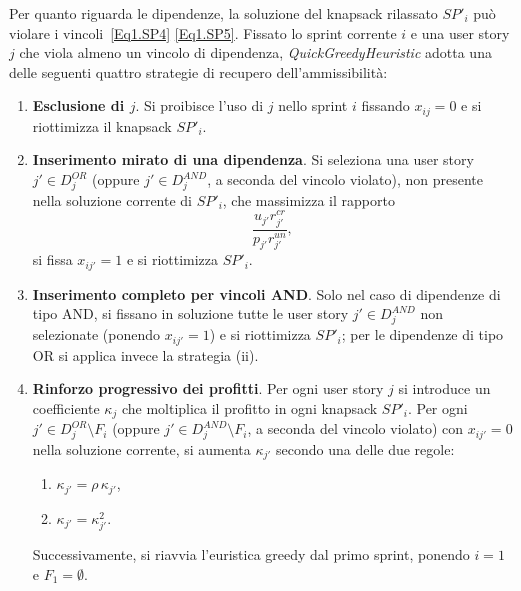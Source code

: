 \documentclass[12pt,a4paper,openright,twoside]{book}
\begin{document}
Per quanto riguarda le dipendenze, la soluzione del knapsack rilassato $SP'_i$ può violare i vincoli~\eqref{Eq1.SP4} \eqref{Eq1.SP5}. Fissato lo sprint corrente $i$ e una user story $j$ che viola almeno un vincolo di dipendenza, \textit{QuickGreedyHeuristic} adotta una delle seguenti quattro strategie di recupero dell'ammissibilità:
\begin{enumerate}[label=\roman*]
\item \textbf{Esclusione di $j$}. Si proibisce l'uso di $j$ nello sprint $i$ fissando $x_{ij}=0$ e si riottimizza il knapsack $SP'_i$.
\item \textbf{Inserimento mirato di una dipendenza}. Si seleziona una user story $j' \in D^{OR}_j$ (oppure $j' \in D^{AND}_j$, a seconda del vincolo violato), non presente nella soluzione corrente di $SP'_i$, che massimizza il rapporto
      \[
      \frac{u_{j'} r_{j'}^{cr}}{p_{j'} r_{j'}^{un}},
      \]
      si fissa $x_{ij'}=1$ e si riottimizza $SP'_i$.
\item \textbf{Inserimento completo per vincoli AND}. Solo nel caso di dipendenze di tipo AND, si fissano in soluzione tutte le user story $j' \in D^{AND}_j$ non selezionate (ponendo $x_{ij'}=1$) e si riottimizza $SP'_i$; per le dipendenze di tipo OR si applica invece la strategia (ii).
\item \textbf{Rinforzo progressivo dei profitti}. Per ogni user story $j$ si introduce un coefficiente $\kappa_j$ che moltiplica il profitto in ogni knapsack $SP'_i$. Per ogni $j' \in D^{OR}_j \setminus F_i$ (oppure $j' \in D^{AND}_j \setminus F_i$, a seconda del vincolo violato) con $x_{ij'}=0$ nella soluzione corrente, si aumenta $\kappa_{j'}$ secondo una delle due regole:
      \begin{enumerate}
      \item $\kappa_{j'} = \rho \,\kappa_{j'}$,
      \item $\kappa_{j'} = \kappa_{j'}^2$.
      \end{enumerate}
      Successivamente, si riavvia l'euristica greedy dal primo sprint, ponendo $i=1$ e $F_1 = \emptyset$.
\end{enumerate}
\end{document}

